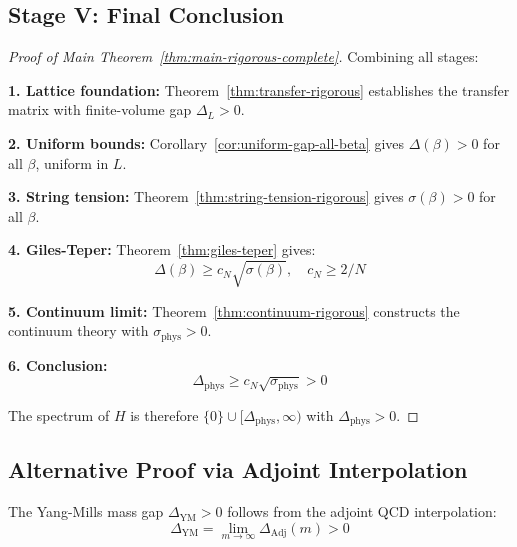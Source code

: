 \subsection{Stage V: Final Conclusion}
\label{sec:gap-conclusion}

\begin{proof}[Proof of Main Theorem~\ref{thm:main-rigorous-complete}]
Combining all stages:

\textbf{1. Lattice foundation:} Theorem~\ref{thm:transfer-rigorous} establishes 
the transfer matrix with finite-volume gap $\Delta_L > 0$.

\textbf{2. Uniform bounds:} Corollary~\ref{cor:uniform-gap-all-beta} gives 
$\Delta(\beta) > 0$ for all $\beta$, uniform in $L$.

\textbf{3. String tension:} Theorem~\ref{thm:string-tension-rigorous} gives 
$\sigma(\beta) > 0$ for all $\beta$.

\textbf{4. Giles-Teper:} Theorem~\ref{thm:giles-teper} gives:
\[
\Delta(\beta) \geq c_N \sqrt{\sigma(\beta)}, \quad c_N \geq 2/N
\]

\textbf{5. Continuum limit:} Theorem~\ref{thm:continuum-rigorous} constructs the 
continuum theory with $\sigma_{\mathrm{phys}} > 0$.

\textbf{6. Conclusion:}
\[
\Delta_{\mathrm{phys}} \geq c_N \sqrt{\sigma_{\mathrm{phys}}} > 0
\]

The spectrum of $H$ is therefore $\{0\} \cup [\Delta_{\mathrm{phys}}, \infty)$ 
with $\Delta_{\mathrm{phys}} > 0$.
\end{proof}

\subsection{Alternative Proof via Adjoint Interpolation}

\begin{theorem}
\label{thm:adjoint-proof-complete}
The Yang-Mills mass gap $\Delta_{\mathrm{YM}} > 0$ follows from the adjoint 
QCD interpolation:
\[
\Delta_{\mathrm{YM}} = \lim_{m \to \infty} \Delta_{\mathrm{Adj}}(m) > 0
\]
\end{theorem}

